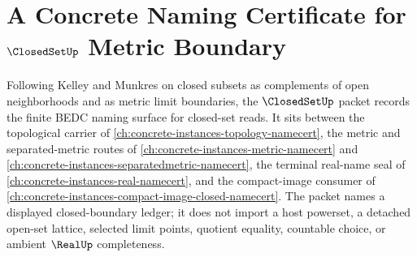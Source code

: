 \chapter{A Concrete Naming Certificate for $\ClosedSetUp$ Metric Boundary}
\label{ch:concrete-instances-closedset-namecert}

Following Kelley and Munkres on closed subsets as complements of open neighborhoods and as metric limit boundaries, the $\ClosedSetUp$ packet records the finite BEDC naming surface for closed-set reads. It sits between the topological carrier of \autoref{ch:concrete-instances-topology-namecert}, the metric and separated-metric routes of \autoref{ch:concrete-instances-metric-namecert} and \autoref{ch:concrete-instances-separatedmetric-namecert}, the terminal real-name seal of \autoref{ch:concrete-instances-real-namecert}, and the compact-image consumer of \autoref{ch:concrete-instances-compact-image-closed-namecert}. The packet names a displayed closed-boundary ledger; it does not import a host powerset, a detached open-set lattice, selected limit points, quotient equality, countable choice, or ambient $\RealUp$ completeness.

